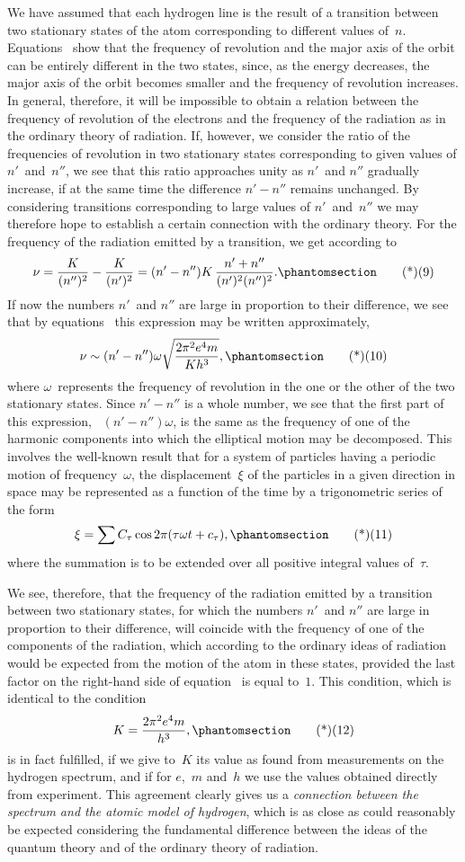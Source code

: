 We have assumed that each hydrogen line is the result of a
transition between two stationary states of the atom corresponding
to different values of~$n$. Equations~ show that the frequency of
revolution and the major axis of the orbit can be entirely different
in the two states, since, as the energy decreases, the major axis of
the orbit becomes smaller and the frequency of revolution increases.
In general, therefore, it will be impossible to obtain a relation between
the frequency of revolution of the electrons and the frequency
of the radiation as in the ordinary theory of radiation. If, however,
we consider the ratio of the frequencies of revolution in two stationary
states corresponding to given values of $n'$~and~$n''$, we see that this
ratio approaches unity as $n'$~and $n''$ gradually increase, if at the
same time the difference $n' - n''$ remains unchanged. By considering
transitions corresponding to large values of $n'$~and~$n''$ we may
therefore hope to establish a certain connection with the ordinary
theory. For the frequency of the radiation emitted by a transition,
we get according to~
\[
\nu = \frac{K}{(n'')^{2}} - \frac{K}{(n')^{2}}
  = (n' - n'') K\, \frac{n' + n''}{(n')^{2} (n'')^{2}}.
\Tag{(9)}
\]
If now the numbers $n'$~and $n''$ are large in proportion to their difference,
we see that by equations~ this expression may be written
approximately,
\[
\nu \sim (n' - n'') \omega \sqrt{\frac{2\pi^{2} e^{4} m}{Kh^{3}}},
\Tag{(10)}
\]
where $\omega$~represents the frequency of revolution in the one or the
other of the two stationary states. Since $n' - n''$ is a whole number,
we see that the first part of this expression, \ie\ $(n' - n'')\omega$, is the
same as the frequency of one of the harmonic components into
which the elliptical motion may be decomposed. This involves the
well-known result that for a system of particles having a periodic
motion of frequency~$\omega$, the displacement~$\xi$ of the particles in a given
direction in space may be represented as a function of the time by
a trigonometric series of the form
\[
\xi = \sum C_{\tau} \cos 2\pi(\tau\omega t + c_{\tau}),
\Tag{(11)}
\]
where the summation is to be extended over all positive integral
values of~$\tau$.

We see, therefore, that the frequency of the radiation emitted
by a transition between two stationary states, for which the numbers
$n'$~and $n''$ are large in proportion to their difference, will coincide
with the frequency of one of the components of the radiation, which
according to the ordinary ideas of radiation would be expected from
the motion of the atom in these states, provided the last factor on
the right-hand side of equation~ is equal to~$1$. This condition,
which is identical to the condition
\[
K = \frac{2\pi^{2} e^{4} m}{h^{3}},
\Tag{(12)}
\]
is in fact fulfilled, if we give to~$K$ its value as found from measurements
on the hydrogen spectrum, and if for $e$,~$m$ and~$h$ we use the
values obtained directly from experiment. This agreement clearly
gives us a \emph{connection between the spectrum and the atomic model of
hydrogen}, which is as close as could reasonably be expected considering
the fundamental difference between the ideas of the quantum
theory and of the ordinary theory of radiation.

